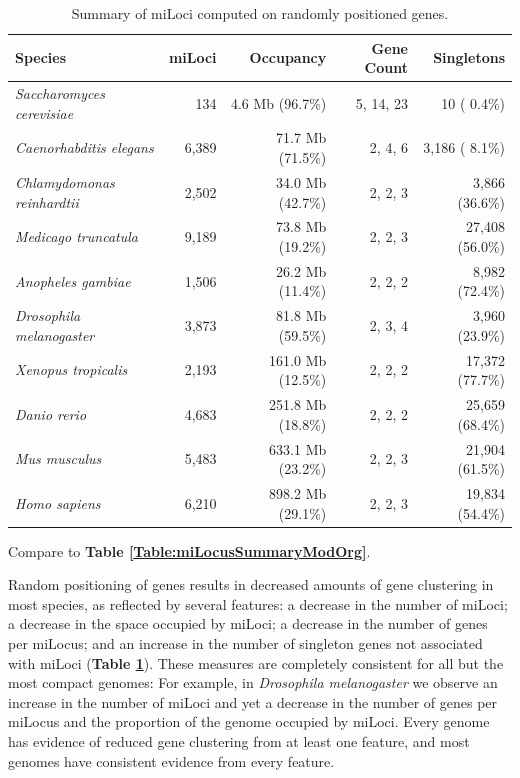 \begin{table}[h]
\caption{Summary of miLoci computed on randomly positioned genes.}
\label{Table:miLocusSummaryShuffled}
\begin{tabularx}{\textwidth}{lrrrr}
\hline
Species                                &               miLoci &            Occupancy &           Gene Count &           Singletons  \\ \hline
\textit{Saccharomyces cerevisiae}      &                  134 &      4.6 Mb (96.7\%) &            5, 14, 23 &          10 ( 0.4\%)  \\
\textit{Caenorhabditis elegans}        &                6,389 &     71.7 Mb (71.5\%) &              2, 4, 6 &       3,186 ( 8.1\%)  \\
\textit{Chlamydomonas reinhardtii}     &                2,502 &     34.0 Mb (42.7\%) &              2, 2, 3 &       3,866 (36.6\%)  \\
\textit{Medicago truncatula}           &                9,189 &     73.8 Mb (19.2\%) &              2, 2, 3 &      27,408 (56.0\%)  \\
\textit{Anopheles gambiae}             &                1,506 &     26.2 Mb (11.4\%) &              2, 2, 2 &       8,982 (72.4\%)  \\
\textit{Drosophila melanogaster}       &                3,873 &     81.8 Mb (59.5\%) &              2, 3, 4 &       3,960 (23.9\%)  \\
\textit{Xenopus tropicalis}            &                2,193 &    161.0 Mb (12.5\%) &              2, 2, 2 &      17,372 (77.7\%)  \\
\textit{Danio rerio}                   &                4,683 &    251.8 Mb (18.8\%) &              2, 2, 2 &      25,659 (68.4\%)  \\
\textit{Mus musculus}                  &                5,483 &    633.1 Mb (23.2\%) &              2, 2, 3 &      21,904 (61.5\%)  \\
\textit{Homo sapiens}                  &                6,210 &    898.2 Mb (29.1\%) &              2, 2, 3 &      19,834 (54.4\%)  \\ \hline
\end{tabularx}
\raggedright
{\scriptsize
Compare to \textbf{Table \ref{Table:miLocusSummaryModOrg}}.
}
\end{table}

Random positioning of genes results in decreased amounts of gene clustering in most species, as reflected by several features: a decrease in the number of miLoci; a decrease in the space occupied by miLoci; a decrease in the number of genes per miLocus; and an increase in the number of singleton genes not associated with miLoci (\textbf{Table \ref{Table:miLocusSummaryShuffled}}).
These measures are completely consistent for all but the most compact genomes:
For example, in \textit{Drosophila melanogaster} we observe an increase in the number of miLoci and yet a decrease in the number of genes per miLocus and the proportion of the genome occupied by miLoci.
Every genome has evidence of reduced gene clustering from at least one feature, and most genomes have consistent evidence from every feature.

